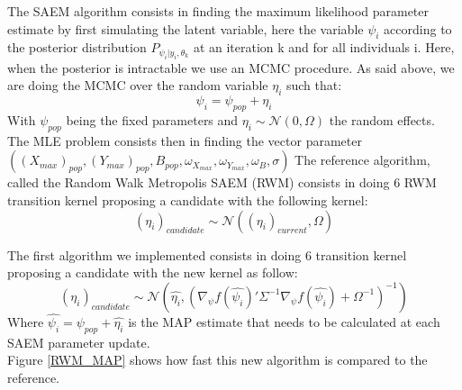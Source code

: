 \documentclass{article}
\begin{document}
\begin{appendices}
The SAEM algorithm consists in finding the maximum likelihood parameter estimate by first simulating the latent variable, here the variable $\psi_i$ according to the posterior distribution $P_{\psi_i|y_i,\theta_k}$ at an iteration k and for all individuals i. Here, when the posterior is intractable we use an MCMC procedure. As said above, we are doing the MCMC over the random variable $\eta_i$ such that:
\begin{equation}
\psi_i = \psi_{pop} + \eta_i
\end{equation}
With $\psi_{pop}$ being the fixed parameters and $\eta_i \sim \mathcal{N}(0,\Omega)$ the random effects.\\
The MLE problem consists then in finding the vector parameter $((X_{max})_{pop},(Y_{max})_{pop},B_{pop},\omega_{X_{max}},\omega_{Y_{max}},\omega_{B},\sigma)$
The reference algorithm, called the Random Walk Metropolis SAEM (RWM) consists in doing 6 RWM transition kernel proposing a candidate with the following kernel:
\begin{equation}
(\eta_i)_{candidate} \sim \mathcal{N}((\eta_i)_{current},\Omega)
\end{equation}

The first algorithm we implemented consists in doing 6 transition kernel proposing a candidate with the new kernel as follow:
\begin{equation}
(\eta_i)_{candidate} \sim \mathcal{N}(\hat{\eta_i},(\nabla_{\psi}f(\hat{\psi_i})'\Sigma^{-1} \nabla_{\psi}f(\hat{\psi_i}) + \Omega^{-1})^{-1})
\end{equation}
Where $\hat{\psi_i} = \psi_{pop} + \hat{\eta_i}$ is the MAP estimate that needs to be calculated at each SAEM parameter update.\\
Figure \ref{RWM_MAP} shows how fast this new algorithm is compared to the reference.



\end{appendices}
\end{document}
